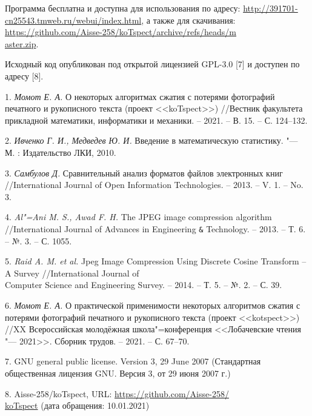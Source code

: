 Программа бесплатна и доступна для использования по адресу: \href{http://391701-cn25543.tmweb.ru/webui/index.html}{http://391701-cn25543.tmweb.ru/webui/index.html},
а также для скачивания:\\\href{https://github.com/Aisse-258/koTspect/archive/refs/heads/master.zip}{https://github.com/Aisse-258/koTspect/archive/refs/heads/m\\aster.zip}.

Исходный код опубликован под открытой лицензией {GPL-3.0} [7] и доступен по адресу [8].





\litlist

1. {\it Момот Е. А.} О некоторых алгоритмах сжатия с потерями фотографий печатного и рукописного текста (проект <<{koTspect}>>) //Вестник факультета прикладной математики, информатики и механики. -- 2021. -- В. 15. -- С. 124--132.

2. {\it Ивченко Г. И., Медведев Ю. И.} Введение в математическую статистику. "--- М. : Издательство ЛКИ, 2010.

3. {\it Самбулов Д.} Сравнительный анализ форматов файлов электронных книг //\foreignlanguage{english}{International Journal of Open Information Technologies. -- 2013. -- V. 1. -- No. 3.}

4. {\it Al"=Ani M. S., Awad F. H.} The JPEG image compression algorithm //International Journal of Advances in Engineering \verb|&| Technology. -- 2013. -- Т. 6. -- №. 3. -- С. 1055.

5. {\it Raid A. M. et al.} Jpeg Image Compression Using Discrete Cosine Transform -- A Survey //International Journal of\\Computer Science and Engineering Survey. -- 2014. -- Т. 5. -- №. 2. -- С. 39.

6. {\it Момот Е. А.} О практической применимости некоторых алгоритмов сжатия с потерями фотографий печатного и рукописного текста (проект <<{kotspect}>>) //{XX} Всероссийская молодёжная школа"=конференция <<Лобачевские чтения "--- 2021>>. Сборник трудов. -- 2021. -- С. 67--70.

7. GNU general public license. Version 3, 29 June 2007 (Стандартная общественная лицензия {GNU}. Версия 3, от 29 июня 2007 г.)

8. Aisse-258/koTspect, URL: \href{https://github.com/Aisse-258/koTspect}{https://github.com/Aisse-258/\\koTspect} (дата обращения: 10.01.2021)

